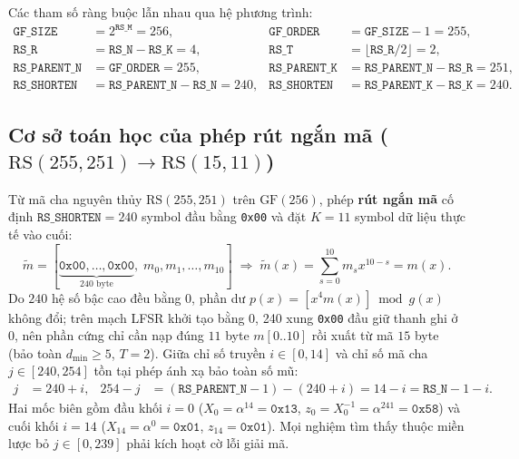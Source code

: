 \documentclass[11pt,a4paper]{report}
\begin{document}
Các tham số ràng buộc lẫn nhau qua hệ phương trình:
\begin{align}
    \texttt{GF\_SIZE}     &= 2^{\texttt{RS\_M}} = 256, &
    \texttt{GF\_ORDER}    &= \texttt{GF\_SIZE} - 1 = 255, \label{eq:rel-gf} \\
    \texttt{RS\_R}        &= \texttt{RS\_N} - \texttt{RS\_K} = 4, &
    \texttt{RS\_T}        &= \lfloor \texttt{RS\_R}/2 \rfloor = 2, \label{eq:rel-rt} \\
    \texttt{RS\_PARENT\_N} &= \texttt{GF\_ORDER} = 255, &
    \texttt{RS\_PARENT\_K} &= \texttt{RS\_PARENT\_N} - \texttt{RS\_R} = 251, \label{eq:rel-parent} \\
    \texttt{RS\_SHORTEN}  &= \texttt{RS\_PARENT\_N} - \texttt{RS\_N} = 240, &
    \texttt{RS\_SHORTEN}  &= \texttt{RS\_PARENT\_K} - \texttt{RS\_K} = 240. \label{eq:rel-shorten}
\end{align}

\subsection{Cơ sở toán học của phép rút ngắn mã (\texorpdfstring{$\text{RS}(255,251) \to \text{RS}(15,11)$}{RS(255,251) -> RS(15,11)})}
\label{sec:shorten}

Từ mã cha nguyên thủy $\text{RS}(255,251)$ trên $\text{GF}(256)$, phép \textbf{rút ngắn mã} cố định $\texttt{RS\_SHORTEN} = 240$ symbol đầu bằng \texttt{0x00} và đặt $K = 11$ symbol dữ liệu thực tế vào cuối:
\begin{equation}
    \tilde{m} = [\underbrace{\texttt{0x00}, \dots, \texttt{0x00}}_{240\text{ byte}}, \; m_0, m_1, \dots, m_{10}] \;\Longrightarrow\; \tilde{m}(x) = \sum_{s=0}^{10} m_s x^{10-s} = m(x).
    \label{eq:shorten-poly}
\end{equation}
Do $240$ hệ số bậc cao đều bằng $0$, phần dư $p(x) = [x^4 m(x)] \bmod g(x)$ không đổi; trên mạch LFSR khởi tạo bằng $0$, 240 xung \texttt{0x00} đầu giữ thanh ghi ở $0$, nên phần cứng chỉ cần nạp đúng $11$ byte $m[0..10]$ rồi xuất từ mã $15$ byte (bảo toàn $d_{\min} \ge 5$, $T = 2$). Giữa chỉ số truyền $i \in [0, 14]$ và chỉ số mã cha $j \in [240, 254]$ tồn tại phép ánh xạ bảo toàn số mũ:
\begin{align}
    j &= 240 + i, &
    254 - j &= (\texttt{RS\_PARENT\_N} - 1) - (240 + i) = 14 - i = \texttt{RS\_N} - 1 - i. \label{eq:map-exp}
\end{align}
Hai mốc biên gồm đầu khối $i = 0$ ($X_0 = \alpha^{14} = \texttt{0x13}$, $z_0 = X_0^{-1} = \alpha^{241} = \texttt{0x58}$) và cuối khối $i = 14$ ($X_{14} = \alpha^{0} = \texttt{0x01}$, $z_{14} = \texttt{0x01}$). Mọi nghiệm tìm thấy thuộc miền lược bỏ $j \in [0, 239]$ phải kích hoạt cờ lỗi giải mã.
\end{document}
